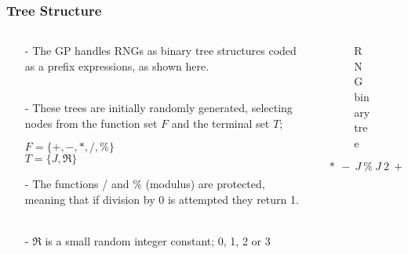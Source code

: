 \documentclass{beamer}
\begin{document}
\begin{frame}
\frametitle{Tree Structure}

\begin{columns}[T]
\begin{column}{0.75\textwidth}
\begin{itemize}
\item[-]The GP handles RNGs as binary tree structures coded as a prefix expressions, as shown here.\\~\\
\item[-]These trees are initially randomly generated, selecting nodes from the function set $F$ and the terminal set $T$;
\begin{center}$F = \{+, -, *, /, \%\}$\\ $T = \{J, \Re\}$ \end{center}

\item[-]The functions / and \% (modulus) are protected, meaning that if division by 0 is attempted they return 1.\\~\\
\item[-]$\Re$ is a small random integer constant; 0, 1, 2 or 3
\end{itemize}

\end{column}
\begin{column}{0.35\textwidth}

\begin{figure}
\caption{RNG binary tree}
\label{fig:simplebintree}
\end{figure}
$\ \ *\ -\ J\ \%\ J\ 2\ +\ 2\ 1$

\end{column}
\end{columns}
\end{frame}
\end{document}
